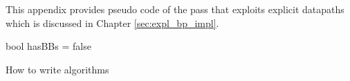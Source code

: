 
This appendix provides pseudo code of the pass that exploits explicit datapaths which is discussed in Chapter \ref{sec:expl_bp_impl}.

\begin{algorithm}[H]
 bool hasBBs = false\;
 \caption{How to write algorithms}
\end{algorithm}